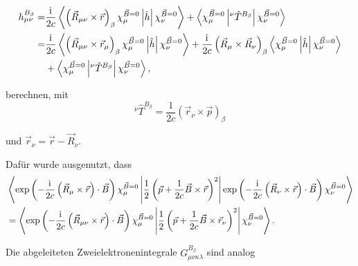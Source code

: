   	 \begin{equation}
  	 \begin{aligned}
  	 h_{\mu\nu}^{B_\beta}=&\frac{\mathrm{i}\mkern1mu}{2c}\left\langle\left(\vec{R}_{\mu\nu}\times\vec{r}\right)_\beta\chi_\mu^{\vec{B}=0}\left\vert\hat{h}\right\vert\chi_\nu^{\vec{B}=0}\right\rangle+\left\langle\chi_\mu^{\vec{B}=0}\left\vert^\nu\hat{T}^{B_\beta}\right\vert\chi_\nu^{\vec{B}=0}\right\rangle\\
  	 =&\frac{\mathrm{i}\mkern1mu}{2c}\left\langle\left(\vec{R}_{\mu\nu}\times\vec{r}_\mu\right)_\beta\chi_\mu^{\vec{B}=0}\left\vert\hat{h}\right\vert\chi_\nu^{\vec{B}=0}\right\rangle
  	 +\frac{\mathrm{i}\mkern1mu}{2c}\left(\vec{R}_{\mu}\times\vec{R}_\nu\right)_\beta\left\langle\chi_\mu^{\vec{B}=0}\left\vert\hat{h}\right\vert\chi_\nu^{\vec{B}=0}\right\rangle\\
  	 &+\left\langle\chi_\mu^{\vec{B}=0}\left\vert^\nu\hat{T}^{B_\beta}\right\vert\chi_\nu^{\vec{B}=0}\right\rangle,
     \end{aligned}
  	 \end{equation}
  	
  	 berechnen,  mit 
   	 \begin{equation}
  	 ^\nu\hat{T}^{B_\beta}=\frac{1}{2c}\left(\vec{r}_\nu\times \vec{p}\right)_\beta
  	 \end{equation}
  	 
  	 und $\vec{r}_\nu=\vec{r}-\vec{R}_\nu$.
  	 
  	 Dafür wurde ausgenutzt, dass\supercite{ditchfield1974self}
  	 \begin{equation}
  	 \begin{aligned}
  	 &\left\langle\exp\left(-\frac{\mathrm{i}\mkern1mu}{2c}\left(\vec{R}_\mu\times\vec{r}\right)\cdot\vec{B}\right)\chi_\mu^{\vec{B}=0}\left\vert\frac{1}{2}\left(\vec{p}+\frac{1}{2c}\vec{B}\times\vec{r}\right)^2\right\vert\exp\left(-\frac{\mathrm{i}\mkern1mu}{2c}\left(\vec{R}_\nu\times\vec{r}\right)\cdot\vec{B}\right)\chi_\nu^{\vec{B}=0}\right\rangle\\
  	 &=\left\langle\exp\left(-\frac{\mathrm{i}\mkern1mu}{2c}\left(\vec{R}_{\mu\nu}\times\vec{r}\right)\cdot\vec{B}\right)\chi_\mu^{\vec{B}=0}\left\vert\frac{1}{2}\left(\vec{p}+\frac{1}{2c}\vec{B}\times\vec{r}_\nu\right)^2\right\vert\chi_\nu^{\vec{B}=0}\right\rangle.
  	 \end{aligned}
  	 \end{equation}
  	 
  	 
  	 Die abgeleiteten Zweielektronenintegrale $G_{\mu\nu\kappa\lambda}^{B_\beta}$ sind analog
  	 
